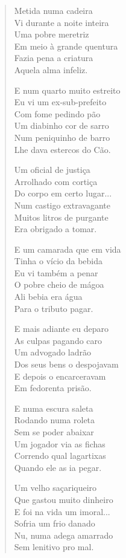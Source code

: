 \begin{verse}
Metida numa cadeira\\
Vi durante a noite inteira\\
Uma pobre meretriz\\
Em meio à grande quentura\\
Fazia pena a criatura\\
Aquela alma infeliz.

E num quarto muito estreito\\
Eu vi um ex-sub-prefeito\\
Com fome pedindo pão\\
Um diabinho cor de sarro\\
Num peniquinho de barro\\
Lhe dava estercos do Cão.
\pagebreak

Um oficial de justiça\\
Arrolhado com cortiça\\
Do corpo em certo lugar...\\
Num castigo extravagante\\
Muitos litros de purgante\\
Era obrigado a tomar.

E um camarada que em vida\\
Tinha o vício da bebida\\
Eu vi também a penar\\
O pobre cheio de mágoa\\
Ali bebia era água\\
Para o tributo pagar.

E mais adiante eu deparo\\
As culpas pagando caro\\
Um advogado ladrão\\
Dos seus bens o despojavam\\
E depois o encarceravam\\
Em fedorenta prisão.

E numa escura saleta\\
Rodando numa roleta\\
Sem se poder abaixar\\
Um jogador via as fichas\\
Correndo qual lagartixas\\
Quando ele as ia pegar.
\pagebreak

Um velho saçariqueiro\\
Que gastou muito dinheiro\\
E foi na vida um imoral...\\
Sofria um frio danado\\
Nu, numa adega amarrado\\
Sem lenitivo pro mal.


\end{verse}
